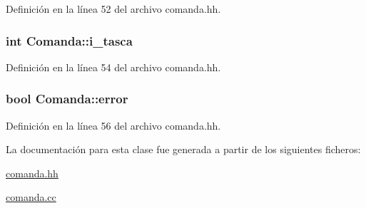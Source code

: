 Definición en la línea 52 del archivo comanda.\-hh.

\hypertarget{class_comanda_aab152fe48a937f449c027a2274fc31e7}{
\subsubsection[{i\-\_\-tasca}]{\setlength{\rightskip}{0pt plus 5cm}int Comanda\-::i\-\_\-tasca\hspace{0.3cm}{\ttfamily [private]}}}\label{class_comanda_aab152fe48a937f449c027a2274fc31e7}


Definición en la línea 54 del archivo comanda.\-hh.

\hypertarget{class_comanda_a9a1bf4bf74940a4bac90140e67d11972}{
\subsubsection[{error}]{\setlength{\rightskip}{0pt plus 5cm}bool Comanda\-::error\hspace{0.3cm}{\ttfamily [private]}}}\label{class_comanda_a9a1bf4bf74940a4bac90140e67d11972}


Definición en la línea 56 del archivo comanda.\-hh.



La documentación para esta clase fue generada a partir de los siguientes ficheros\-:\begin{DoxyCompactItemize}
\item 
\hyperlink{comanda_8hh}{comanda.\-hh}\item 
\hyperlink{comanda_8cc}{comanda.\-cc}\end{DoxyCompactItemize}
